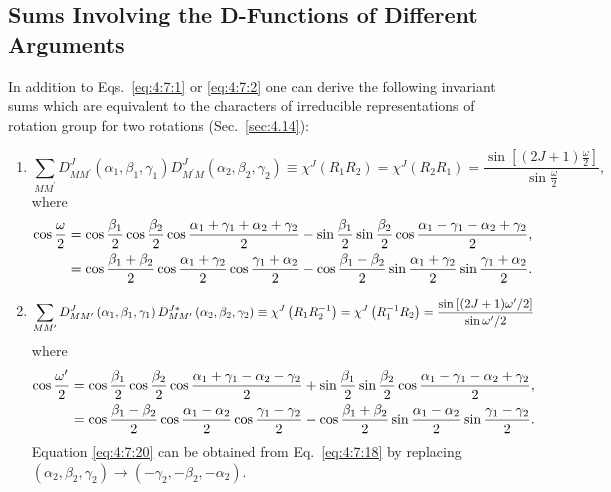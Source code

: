 \subsection{Sums Involving the D-Functions of Different Arguments}\label{sec:4.7.5}
In addition to Eqs.~\eqref{eq:4:7:1} or \eqref{eq:4:7:2} one can derive the following invariant sums which are equivalent to the characters of irreducible representations of rotation group for two rotations (Sec.~\ref{sec:4.14}):
\begin{enumerate}[label=(\alph*)]
\item
\begin{equation}
\sum_{M M^{\prime}} D_{M M^{\prime}}^{J}\left(\alpha_{1}, \beta_{1}, \gamma_{1}\right) D_{M^{\prime} M}^{J}\left(\alpha_{2}, \beta_{2}, \gamma_{2}\right) \equiv \chi^{J}\left(R_{1} R_{2}\right)=\chi^{J}\left(R_{2} R_{1}\right)=\frac{\sin \left[(2 J+1) \frac{\omega}{2}\right]}{\sin \frac{\omega}{2}} ,\label{eq:4:7:17}
\end{equation}
where
\begin{align}
\cos \frac{\omega}{2} & =\cos \frac{\beta_{1}}{2} \cos \frac{\beta_{2}}{2} \cos \frac{\alpha_{1}+\gamma_{1}+\alpha_{2}+\gamma_{2}}{2}-\sin \frac{\beta_{1}}{2} \sin \frac{\beta_{2}}{2} \cos \frac{\alpha_{1}-\gamma_{1}-\alpha_{2}+\gamma_{2}}{2}  ,\notag\\
& =\cos \frac{\beta_{1}+\beta_{2}}{2} \cos \frac{\alpha_{1}+\gamma_{2}}{2} \cos \frac{\gamma_{1}+\alpha_{2}}{2}-\cos \frac{\beta_{1}-\beta_{2}}{2} \sin \frac{\alpha_{1}+\gamma_{2}}{2} \sin \frac{\gamma_{1}+\alpha_{2}}{2} .\label{eq:4:7:18}
\end{align}
\item
\begin{equation}
\sum_{M M^{\prime}} D_{M M^{\prime}}^{J}\left(\alpha_{1}, \beta_{1}, \gamma_{1}\right) D_{M M^{\prime}}^{J *}\left(\alpha_{2}, \beta_{2}, \gamma_{2}\right) \equiv \chi^{J}\left(R_{1} R_{2}^{-1}\right)=\chi^{J}\left(R_{1}^{-1} R_{2}\right)=\frac{\sin \left[(2 J+1) \omega^{\prime}/2\right]}{\sin \omega^{\prime}/2} \label{eq:4:7:19}
\end{equation}
where
\begin{align}
\cos \frac{\omega^{\prime}}{2} & =\cos \frac{\beta_{1}}{2} \cos \frac{\beta_{2}}{2} \cos \frac{\alpha_{1}+\gamma_{1}-\alpha_{2}-\gamma_{2}}{2}+\sin \frac{\beta_{1}}{2} \sin \frac{\beta_{2}}{2} \cos \frac{\alpha_{1}-\gamma_{1}-\alpha_{2}+\gamma_{2}}{2}  ,\notag\\
& =\cos \frac{\beta_{1}-\beta_{2}}{2} \cos \frac{\alpha_{1}-\alpha_{2}}{2} \cos \frac{\gamma_{1}-\gamma_{2}}{2}-\cos \frac{\beta_{1}+\beta_{2}}{2} \sin \frac{\alpha_{1}-\alpha_{2}}{2} \sin \frac{\gamma_{1}-\gamma_{2}}{2} .\label{eq:4:7:20}
\end{align}
Equation \eqref{eq:4:7:20} can be obtained from Eq.~\eqref{eq:4:7:18} by replacing $\left(\alpha_{2}, \beta_{2}, \gamma_{2}\right) \rightarrow\left(-\gamma_{2},-\beta_{2},-\alpha_{2}\right)$.
\end{enumerate}


